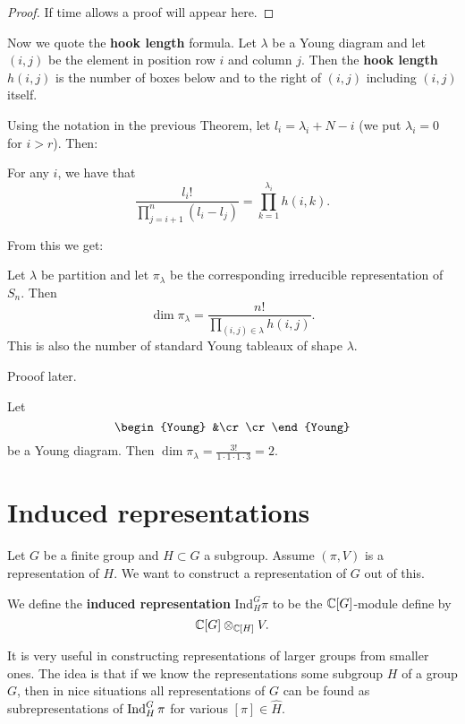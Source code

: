 \documentclass[11pt, english]{article}
\begin{document}
\begin{proof}
  If time allows a proof will appear here.
\end{proof}

Now we quote the \textbf{hook length} formula. Let $\lambda$ be a Young diagram and let $(i,j)$ be the element in position row $i$ and column $j$. Then the \textbf{hook length} $h(i,j)$ is the number of boxes below and to the right of $(i,j)$ including $(i,j)$ itself.

Using the notation in the previous Theorem, let $l_i = \lambda_i + N - i$ (we put $\lambda_i=0$ for $i > r$). Then:

\begin{lemma}
  For any $i$, we have that
$$
\frac{l_i!}{\prod_{j=i+1}^n (l_i-l_j)} = \prod_{k=1}^{\lambda_i} h(i,k).
$$
\end{lemma}

From this we get:

\begin{thm}
  Let $\lambda$ be partition and let $\pi_\lambda$ be the corresponding irreducible representation of $S_n$. Then 
$$
\dim \pi_\lambda = \frac{n!}{\prod_{(i,j) \in \lambda} h(i,j)}.
$$
This is also the number of standard Young tableaux of shape $\lambda$.
\end{thm}

Prooof later.

\begin{example}
Let
$$
\begin{Young}
&\cr
\cr
\end{Young}
$$
be a Young diagram. Then $\dim \pi_\lambda= \frac{3!}{1 \cdot 1 \cdot 1 \cdot 3}=2$.
\end{example}

\newpage
\section{Induced representations}

Let $G$ be a finite group and $H \subset G$ a subgroup. Assume $(\pi,V)$ is a representation of $H$. We want to construct a representation of $G$ out of this.

We define the \textbf{induced representation} $\mathrm{Ind}_H^G \pi$ to be the $\mathbb{C}[G]$-module define by
$$
\mathbb{C}[G] \otimes_{\mathbb{C}[H]} V.
$$

It is very useful in constructing representations of larger groups from smaller ones. The idea is that if we know the representations some subgroup $H$ of a group $G$, then in nice situations all representations of $G$ can be found as subrepresentations of $\operatorname{Ind}_H^G \pi$ for various $[\pi] \in \hat H$.
\end{document}
